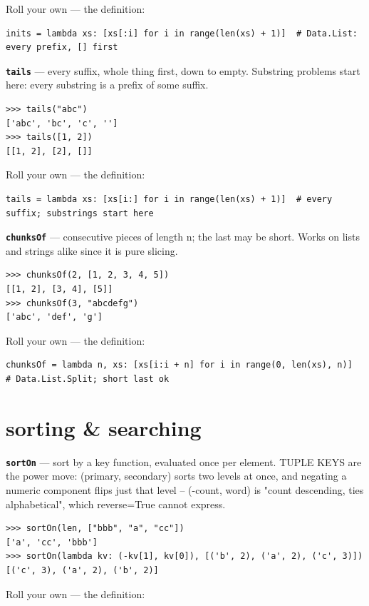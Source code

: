 \documentclass[10pt,letterpaper]{article}
\begin{document}
Roll your own --- the definition:

\begin{lstlisting}[style=ex]
inits = lambda xs: [xs[:i] for i in range(len(xs) + 1)]  # Data.List: every prefix, [] first
\end{lstlisting}
\textbf{\texttt{tails}} --- every suffix, whole thing first, down to empty. Substring problems start here: every substring is a prefix of some suffix.
\begin{lstlisting}[style=ex]
>>> tails("abc")
['abc', 'bc', 'c', '']
>>> tails([1, 2])
[[1, 2], [2], []]
\end{lstlisting}

Roll your own --- the definition:

\begin{lstlisting}[style=ex]
tails = lambda xs: [xs[i:] for i in range(len(xs) + 1)]  # every suffix; substrings start here
\end{lstlisting}
\textbf{\texttt{chunksOf}} --- consecutive pieces of length n; the last may be short. Works on lists and strings alike since it is pure slicing.
\begin{lstlisting}[style=ex]
>>> chunksOf(2, [1, 2, 3, 4, 5])
[[1, 2], [3, 4], [5]]
>>> chunksOf(3, "abcdefg")
['abc', 'def', 'g']
\end{lstlisting}

Roll your own --- the definition:

\begin{lstlisting}[style=ex]
chunksOf = lambda n, xs: [xs[i:i + n] for i in range(0, len(xs), n)]  # Data.List.Split; short last ok
\end{lstlisting}

\section{sorting \& searching}
\textbf{\texttt{sortOn}} --- sort by a key function, evaluated once per element. TUPLE KEYS are the power move: (primary, secondary) sorts two levels at once, and negating a numeric component flips just that level -- (-count, word) is "count descending, ties alphabetical", which reverse=True cannot express.
\begin{lstlisting}[style=ex]
>>> sortOn(len, ["bbb", "a", "cc"])
['a', 'cc', 'bbb']
>>> sortOn(lambda kv: (-kv[1], kv[0]), [('b', 2), ('a', 2), ('c', 3)])
[('c', 3), ('a', 2), ('b', 2)]
\end{lstlisting}

Roll your own --- the definition:
\end{document}
